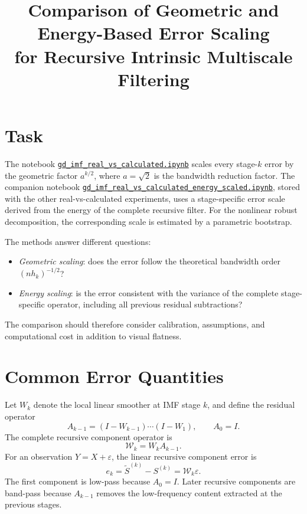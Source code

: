 \documentclass[11pt]{article}
\title{Comparison of Geometric and Energy-Based Error Scaling\\
for Recursive Intrinsic Multiscale Filtering}
\author{}
\date{}
\newcommand{\Wcal}{\mathcal{W}}
\begin{document}
\maketitle

\section{Task}

The notebook \href{https://github.com/mkuziuk/imf/blob/main/experiments/real-vs-calculated/gd_imf_real_vs_calculated.ipynb}{\texttt{gd\_imf\_real\_vs\_calculated.ipynb}} scales every
stage-$k$ error by the geometric factor $a^{k/2}$, where $a=\sqrt{2}$ is the
bandwidth reduction factor. The companion notebook
\href{https://github.com/mkuziuk/imf/blob/main/experiments/real-vs-calculated/gd_imf_real_vs_calculated_energy_scaled.ipynb}{\texttt{gd\_imf\_real\_vs\_calculated\_energy\_scaled.ipynb}}, stored with the
other real-vs-calculated experiments, uses a stage-specific error scale derived from
the energy of the complete recursive filter. For the nonlinear robust
decomposition, the corresponding scale is estimated by a parametric bootstrap.

The methods answer different questions:

\begin{itemize}
    \item \emph{Geometric scaling}: does the error follow the theoretical
    bandwidth order $(nh_k)^{-1/2}$?
    \item \emph{Energy scaling}: is the error consistent with the variance of
    the complete stage-specific operator, including all previous residual
    subtractions?
\end{itemize}

The comparison should therefore consider calibration, assumptions, and
computational cost in addition to visual flatness.

\section{Common Error Quantities}

Let $W_k$ denote the local linear smoother at IMF stage $k$, and define the
residual operator
\[
A_{k-1}=(I-W_{k-1})\cdots(I-W_1),
\qquad A_0=I.
\]
The complete recursive component operator is
\[
\Wcal_k=W_kA_{k-1}.
\]
For an observation $Y=X+\varepsilon$, the linear recursive component error is
\[
e_k=\widetilde S^{(k)}-S^{(k)}=\Wcal_k\varepsilon.
\]
The first component is low-pass because $A_0=I$. Later recursive components are
band-pass because $A_{k-1}$ removes the low-frequency content extracted at the
previous stages.
\end{document}
